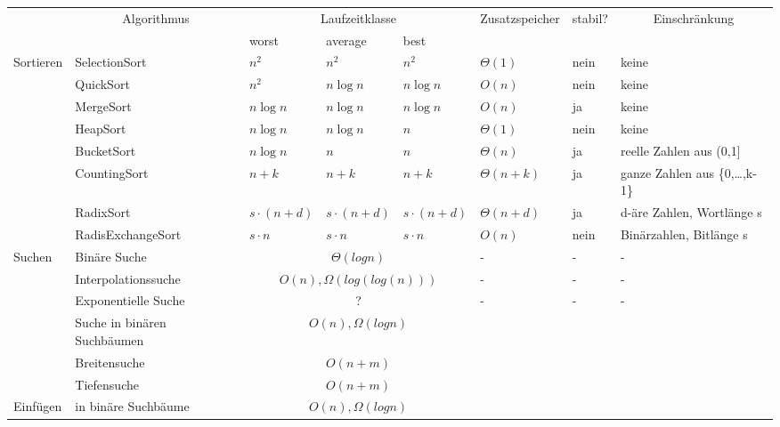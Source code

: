 \begin{tabular}{l|l|lll|l|l|l}
      & \multicolumn{1}{c|}{\multirow{2}[0]{*}{Algorithmus}} & \multicolumn{3}{c|}{Laufzeitklasse} & \multicolumn{1}{c|}{\multirow{2}[0]{*}{Zusatzspeicher}} & \multicolumn{1}{c|}{\multirow{2}[0]{*}{stabil?}} & \multicolumn{1}{c}{\multirow{2}[0]{*}{Einschr\"ankung}} \\ 
      & \multicolumn{1}{c|}{} & worst & average & best  & \multicolumn{1}{c|}{} & \multicolumn{1}{c|}{} & \multicolumn{1}{c}{} \\ \hline
Sortieren & SelectionSort & $n^2$ & $n^2$ & $n^2$ & $\Theta(1)$ & nein  & keine \\
      & QuickSort & $n^2$ & $n \log n$ & $n \log n$ & $O(n)$ & nein  & keine \\
      & MergeSort & $n \log n$ & $n \log n$ & $n \log n$ & $O(n)$ & ja    & keine \\
      & HeapSort & $n \log n$ & $n \log n$ & $n$   & $\Theta(1)$ & nein  & keine \\
      & BucketSort & $n \log n$ & $n$   & $n$   & $\Theta(n)$ & ja    & reelle Zahlen aus (0,1] \\
      & CountingSort & $n+k$ & $n+k$ & $n+k$ & $\Theta(n+k)$ & ja    & ganze Zahlen aus \{0,\dots,k-1\} \\
      & RadixSort & $s\cdot (n+d)$ & $s\cdot (n+d)$ & $s\cdot (n+d)$ & $\Theta(n+d)$ & ja    & d-\"are Zahlen, Wortl\"ange s \\
      & RadisExchangeSort & $s\cdot n$ & $s\cdot n$ & $s\cdot n$ & $O(n)$ & nein  & Bin\"arzahlen, Bitl\"ange s \\\hline
Suchen & Bin\"are Suche & \multicolumn{3}{c|}{$\Theta(log n)$} & -     & -     & - \\
      & Interpolationssuche & \multicolumn{3}{c|}{$O(n), \Omega(log(log(n)))$} & -     & -     & - \\
      & Exponentielle Suche & \multicolumn{3}{c|}{?} & -     & -     & - \\
      & Suche in bin\"aren Suchb\"aumen & \multicolumn{3}{c|}{$O(n), \Omega(log n)$} &       &       &  \\
      & Breitensuche & \multicolumn{3}{c|}{$O(n+m)$} &       &       &  \\
      & Tiefensuche & \multicolumn{3}{c|}{$O(n+m)$} &       &       &  \\\hline
Einf\"ugen & in bin\"are Suchb\"aume & \multicolumn{3}{c|}{$O(n), \Omega(log n)$} &       &       &  \\
\end{tabular}%

